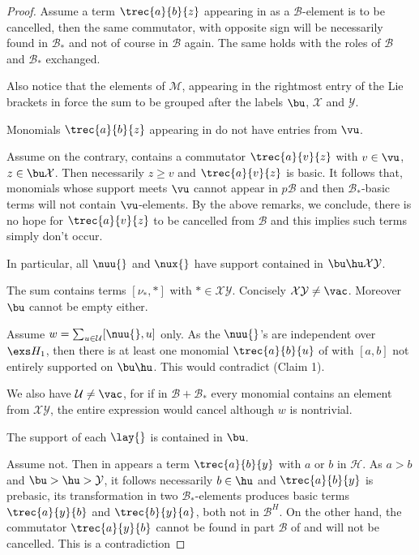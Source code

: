 \begin{proof}
Assume a term $\trec{a}{b}{z}$ appearing in  as a $\mathcal{B}$-element is to be cancelled,
then the same commutator, with opposite sign will be necessarily found in $\mathcal{B}_{*}$ and not of course in $\mathcal{B}$ again.
The same holds with the roles of $\mathcal{B}$ and $\mathcal{B}_{*}$ exchanged.

Also notice that the elements of $\mathcal{M}$, appearing in the rightmost entry of the
Lie brackets in  force the sum to be grouped after the labels $\bu$, $\mathcal{X}$ and $\mathcal{Y}$.
\begin{itemize}
Monomials $\trec{a}{b}{z}$ appearing in  do not have entries from $\vu$.
\end{itemize}
Assume on the contrary,  contains a commutator $\trec{a}{v}{z}$ with $v\in\vu$, $z\in\bu \mathcal{X}$.
Then necessarily $z\geq v$ and $\trec{a}{v}{z}$ is basic. It follows that, monomials whose support meets $\vu$
cannot appear in $p\mathcal{B}$ and then $\mathcal{B}_{*}$-basic terms will not contain $\vu$-elements.
By the above remarks, we conclude, there is no hope for  $\trec{a}{v}{z}$ to be cancelled from $\mathcal{B}$ and this implies such terms simply don't occur.

In particular, all $\nuu{}$ and $\nux{}$ have support contained in $\bu\hu \mathcal{X}\mathcal{Y}$.

\begin{itemize}
The sum  contains terms $[\nu_{\ast}, \ast]$ with $\ast\in \mathcal{X}\mathcal{Y}$. Concisely
$\mathcal{X}\mathcal{Y}\neq\vac$. Moreover $\bu$ cannot be empty either.
\end{itemize}
Assume $w=\sum_{u\in\mathcal{U}}[\nuu{}, u]$ only. As the $\nuu{}$'s are independent over $\exs H_1$, then there is at least one
monomial $\trec{a}{b}{u}$ of  with 
$[a,b]$ not entirely supported on $\bu\hu$. This would contradict (Claim 1).

We also have $\mathcal{U}\neq\vac$, for if in $\mathcal{B}+\mathcal{B}_*$ every monomial contains an element from $\mathcal{X}\mathcal{Y}$, %
the entire expression would cancel although $w$ is nontrivial.
\begin{itemize}
The support of each $\lay{}$ is contained in $\bu$.
\end{itemize}
Assume not. Then in  appears a term $\trec{a}{b}{y}$ with $a$ or $b$ in $\mathcal{H}$.
As $a>b$ and $\bu>\hu>\mathcal{Y}$, it follows necessarily
$b\in\hu$ and $\trec{a}{b}{y}$ is prebasic, its transformation in two $\mathcal{B}_*$-elements produces basic terms
$\trec{a}{y}{b}$ and $\trec{b}{y}{a}$, both not in $\mathcal{B}^{H}$.
On the other hand, the commutator $\trec{a}{y}{b}$ cannot be found in part
$\mathcal{B}$ of  and will not be cancelled. This is a contradiction


\end{proof}
